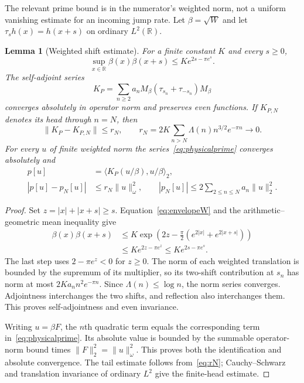 \documentclass[11pt,a4paper]{article}
\numberwithin{equation}{section}
\newtheorem{lemma}[theorem]{Lemma}
\theoremstyle{remark}
\newcommand{\R}{\mathbb R}
\newcommand{\ip}[2]{\langle #1,#2\rangle}
\newcommand{\norm}[1]{\lVert #1\rVert}
\begin{document}
The relevant prime bound is in the numerator's weighted norm, not a uniform vanishing estimate for an incoming jump rate. Let $\beta=\sqrt W$ and let $\tau_sh(x)=h(x+s)$ on ordinary $L^2(\R)$.

\begin{lemma}[Weighted shift estimate]\label{lem:prime}
For a finite constant $K$ and every $s\ge0$,
\begin{equation}\label{eq:betaprod}
 \sup_{x\in\R}\beta(x)\beta(x+s)\le K e^{2s-\pi e^s}.
\end{equation}
The self-adjoint series
\begin{equation}\label{eq:KP}
 K_P=\sum_{n\ge2}a_nM_\beta(\tau_{s_n}+\tau_{-s_n})M_\beta
\end{equation}
converges absolutely in operator norm and preserves even functions. If $K_{P,N}$ denotes its head through $n=N$, then
\begin{equation}\label{eq:rN}
 \norm{K_P-K_{P,N}}\le r_N,
 \qquad r_N=2K\sum_{n>N}\Lambda(n)n^{3/2}e^{-\pi n}\longrightarrow0.
\end{equation}
For every $u$ of finite weighted norm the series~\eqref{eq:physicalprime} converges absolutely and
\begin{align}
 p[u]&=\ip{K_P(u/\beta)}{u/\beta}_2,\label{eq:prepresentation}\\
 |p[u]-p_N[u]|&\le r_N\norm{u}_\omega^2,\qquad
 |p_N[u]|\le2\sum_{2\le n\le N}a_n\norm{u}_2^2.\label{eq:headtail}
\end{align}
\end{lemma}
\begin{proof}
Set $z=|x|+|x+s|\ge s$. Equation~\eqref{eq:envelopeW} and the arithmetic--geometric mean inequality give
\begin{align*}
 \beta(x)\beta(x+s)
 &\le K\exp\!\left(2z-\frac\pi2(e^{2|x|}+e^{2|x+s|})\right)\\
 &\le K e^{2z-\pi e^z}\le K e^{2s-\pi e^s}.
\end{align*}
The last step uses $2-\pi e^z<0$ for $z\ge0$. The norm of each weighted translation is bounded by the supremum of its multiplier, so its two-shift contribution at $s_n$ has norm at most $2Ka_nn^2e^{-\pi n}$. Since $\Lambda(n)\le\log n$, the norm series converges. Adjointness interchanges the two shifts, and reflection also interchanges them. This proves self-adjointness and even invariance.

Writing $u=\beta F$, the $n$th quadratic term equals the corresponding term in~\eqref{eq:physicalprime}. Its absolute value is bounded by the summable operator-norm bound times $\norm{F}_2^2=\norm{u}_\omega^2$. This proves both the identification and absolute convergence. The tail estimate follows from~\eqref{eq:rN}; Cauchy--Schwarz and translation invariance of ordinary $L^2$ give the finite-head estimate.
\end{proof}
\end{document}
